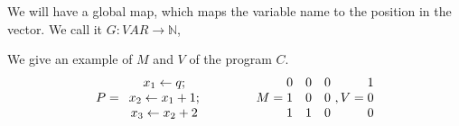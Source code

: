 \documentclass[a4paper,11pt]{article}
\begin{document}
We will have a global map, which maps the variable name to the position in the vector. We call it $G: VAR \to \mathbb{N}$,

We give an example of $M$ and $V$ of the program $C$. 
$$
P= \begin{array}{c}
\mathrel{ x_1 \leftarrow q } ;        \\
\mathrel{ x_2 \leftarrow x_1+1 } ;\\
\mathrel{ x_3 \leftarrow x_2+2 } 
\end{array}~~~~~~~~~~~~
M =  \begin{matrix}
 0 & 0 & 0 \\
1 & 0 & 0 \\
1 & 1 & 0 \\
\end{matrix} ~ , V = \begin{matrix}
  1 \\
 0 \\
 0 \\
\end{matrix}
$$
\end{document}
